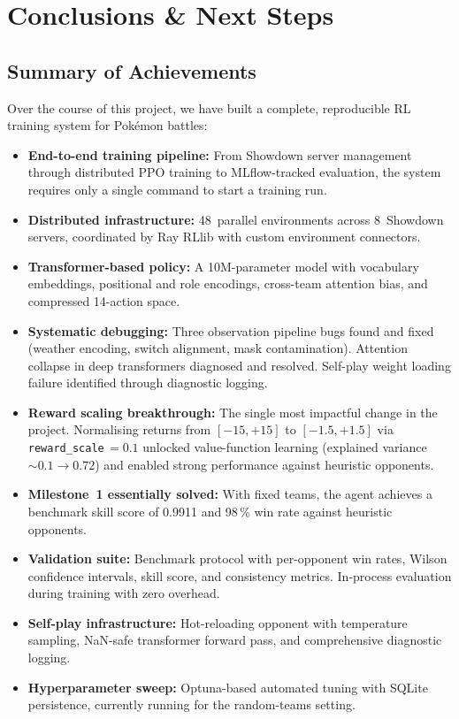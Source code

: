 \chapter{Conclusions \& Next Steps}
\label{ch:conclusions}

\section{Summary of Achievements}

Over the course of this project, we have built a complete, reproducible RL
training system for Pok\'{e}mon battles:

\begin{itemize}
  \item \textbf{End-to-end training pipeline:} From Showdown server management
        through distributed PPO training to MLflow-tracked evaluation, the
        system requires only a single command to start a training run.
  \item \textbf{Distributed infrastructure:} 48~parallel environments across
        8~Showdown servers, coordinated by Ray RLlib with custom environment
        connectors.
  \item \textbf{Transformer-based policy:} A 10M-parameter model with
        vocabulary embeddings, positional and role encodings, cross-team
        attention bias, and compressed 14-action space.
  \item \textbf{Systematic debugging:} Three observation pipeline bugs found
        and fixed (weather encoding, switch alignment, mask contamination).
        Attention collapse in deep transformers diagnosed and resolved.
        Self-play weight loading failure identified through diagnostic
        logging.
  \item \textbf{Reward scaling breakthrough:} The single most impactful change
        in the project.  Normalising returns from $[-15,+15]$ to $[-1.5,+1.5]$
        via \texttt{reward\_scale}$\,=0.1$ unlocked value-function learning
        (explained variance ${\sim}0.1 \to 0.72$) and enabled strong
        performance against heuristic opponents.
  \item \textbf{Milestone~1 essentially solved:} With fixed teams, the agent
        achieves a benchmark skill score of 0.9911 and 98\,\% win rate against
        heuristic opponents.
  \item \textbf{Validation suite:} Benchmark protocol with per-opponent win
        rates, Wilson confidence intervals, skill score, and consistency
        metrics.  In-process evaluation during training with zero overhead.
  \item \textbf{Self-play infrastructure:} Hot-reloading opponent with
        temperature sampling, NaN-safe transformer forward pass, and
        comprehensive diagnostic logging.
  \item \textbf{Hyperparameter sweep:} Optuna-based automated tuning with
        SQLite persistence, currently running for the random-teams setting.
\end{itemize}

